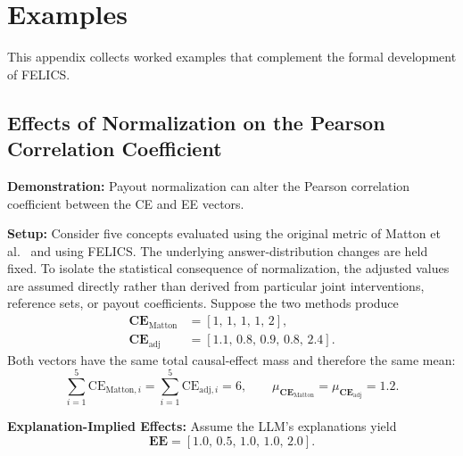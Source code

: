 \chapter{Examples}
\label{app:examples}
This appendix collects worked examples that complement the formal development of FELICS.

\section*{Effects of Normalization on the Pearson Correlation Coefficient}
\begin{example_box}[label=ex:payout_normalization_correlation]
    \textbf{Demonstration:} Payout normalization can alter the Pearson correlation coefficient between the CE and EE vectors.

    \smallskip
    \textbf{Setup:} Consider five concepts evaluated using the original metric of Matton et al.~\cite{mattonWalkTalkMeasuring2024} and using FELICS. The underlying answer-distribution changes are held fixed. To isolate the statistical consequence of normalization, the adjusted values are assumed directly rather than derived from particular joint interventions, reference sets, or payout coefficients. Suppose the two methods produce
    \begin{align}
        \mathbf{CE}_{\mathrm{Matton}} & = \left[1,\,1,\,1,\,1,\,2\right], \\
        \mathbf{CE}_{\mathrm{adj}}    & = \left[1.1,\,0.8,\,0.9,\,0.8,\,2.4\right].
    \end{align}
    Both vectors have the same total causal-effect mass and therefore the same mean:
    \begin{equation}
        \sum_{i=1}^{5}\mathrm{CE}_{\mathrm{Matton},i}
        =\sum_{i=1}^{5}\mathrm{CE}_{\mathrm{adj},i}=6,
        \qquad
        \mu_{\mathbf{CE}_{\mathrm{Matton}}}
        =\mu_{\mathbf{CE}_{\mathrm{adj}}}=1.2.
    \end{equation}

    \smallskip
    \textbf{Explanation-Implied Effects:} Assume the LLM’s explanations yield
    \begin{equation}
        \mathbf{EE} = \left[1.0,\, 0.5,\, 1.0,\, 1.0,\, 2.0\right].
    \end{equation}


\end{example_box}
